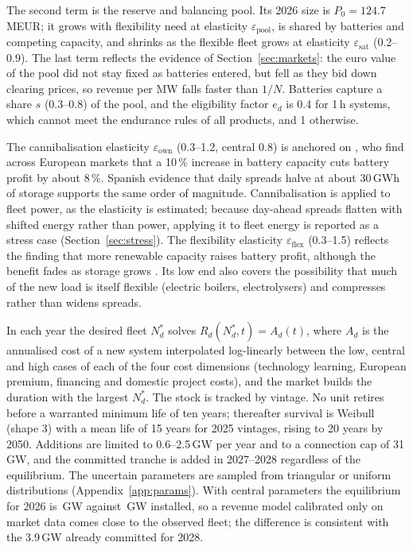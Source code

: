 \documentclass[11pt]{article}
\newcommand{\EUR}{EUR}
\begin{document}
The second term is the reserve and balancing pool. Its 2026 size is $P_0=124.7$\,M\EUR{}; it grows with flexibility need at elasticity $\varepsilon_{\mathrm{pool}}$, is shared by batteries and competing capacity, and shrinks as the flexible fleet grows at elasticity $\varepsilon_{\mathrm{sat}}$ (0.2--0.9). The last term reflects the evidence of Section~\ref{sec:markets}: the euro value of the pool did not stay fixed as batteries entered, but fell as they bid down clearing prices, so revenue per MW falls faster than $1/N$. Batteries capture a share $s$ (0.3--0.8) of the pool, and the eligibility factor $e_d$ is 0.4 for 1\,h systems, which cannot meet the endurance rules of all products, and 1 otherwise.

The cannibalisation elasticity $\varepsilon_{\mathrm{own}}$ (0.3--1.2, central 0.8) is anchored on \citet{savelli2026cannibalisation}, who find across European markets that a 10\,\% increase in battery capacity cuts battery profit by about 8\,\%. Spanish evidence that daily spreads halve at about 30\,GWh of storage \citep{seville2026spain} supports the same order of magnitude.
Cannibalisation is applied to fleet power, as the elasticity is estimated; because day-ahead spreads flatten with shifted energy rather than power, applying it to fleet energy is reported as a stress case (Section~\ref{sec:stress}).
The flexibility elasticity $\varepsilon_{\mathrm{flex}}$ (0.3--1.5) reflects the finding that more renewable capacity raises battery profit, although the benefit fades as storage grows \citep{savelli2026cannibalisation,dumitrescu2024price}. Its low end also covers the possibility that much of the new load is itself flexible (electric boilers, electrolysers) and compresses rather than widens spreads.

In each year the desired fleet $N^*_d$ solves $R_d(N^*_d,t)=A_d(t)$, where $A_d$ is the annualised cost of a new system interpolated log-linearly between the low, central and high cases of each of the four cost dimensions (technology learning, European premium, financing and domestic project costs), and the market builds the duration with the largest $N^*_d$.
The stock is tracked by vintage. No unit retires before a warranted minimum life of ten years; thereafter survival is Weibull (shape 3) with a mean life of 15 years for 2025 vintages, rising to 20 years by 2050. Additions are limited to 0.6--2.5\,GW per year and to a connection cap of 31\,GW, and the committed tranche is added in 2027--2028 regardless of the equilibrium.
The  uncertain parameters are sampled from triangular or uniform distributions (Appendix~\ref{app:params}).
With central parameters the equilibrium for 2026 is \,GW against \,GW installed, so a revenue model calibrated only on market data comes close to the observed fleet; the difference is consistent with the 3.9\,GW already committed for 2028.
\end{document}
